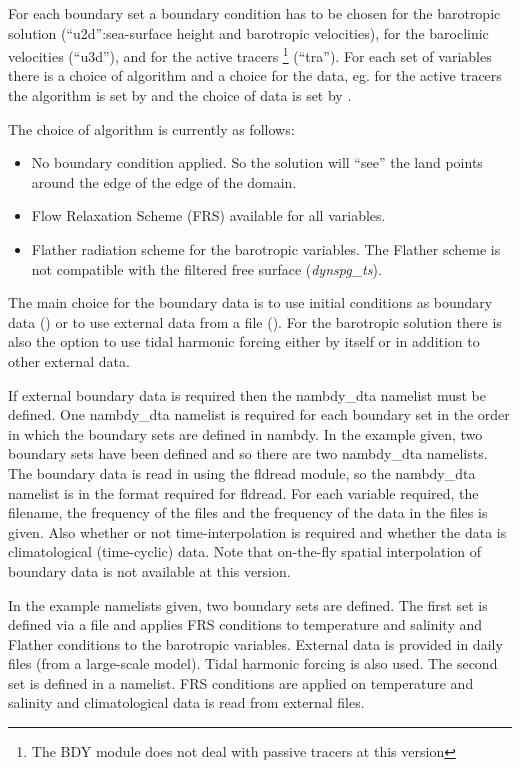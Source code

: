 \documentclass[../main/NEMO_manual]{subfiles}
\begin{document}
For each boundary set a boundary condition has to be chosen for the barotropic solution
(``u2d'':sea-surface height and barotropic velocities), for the baroclinic velocities (``u3d''), and
for the active tracers \footnote{The BDY module does not deal with passive tracers at this version} (``tra'').
For each set of variables there is a choice of algorithm and a choice for the data,
eg. for the active tracers the algorithm is set by  and the choice of data is set by . 

The choice of algorithm is currently as follows:

\begin{itemize}
\item[0.] No boundary condition applied.
  So the solution will ``see'' the land points around the edge of the edge of the domain.
\item[1.] Flow Relaxation Scheme (FRS) available for all variables.
\item[2.] Flather radiation scheme for the barotropic variables.
  The Flather scheme is not compatible with the filtered free surface
  ({\it dynspg\_ts}). 
\end{itemize}

The main choice for the boundary data is to use initial conditions as boundary data
() or to use external data from a file ().
For the barotropic solution there is also the option to use tidal harmonic forcing either by
itself or in addition to other external data. 

If external boundary data is required then the nambdy\_dta namelist must be defined.
One nambdy\_dta namelist is required for each boundary set in the order in which
the boundary sets are defined in nambdy.
In the example given, two boundary sets have been defined and so there are two nambdy\_dta namelists.
The boundary data is read in using the fldread module,
so the nambdy\_dta namelist is in the format required for fldread.
For each variable required, the filename, the frequency of the files and
the frequency of the data in the files is given.
Also whether or not time-interpolation is required and whether the data is climatological (time-cyclic) data.
Note that on-the-fly spatial interpolation of boundary data is not available at this version. 

In the example namelists given, two boundary sets are defined.
The first set is defined via a file and applies FRS conditions to temperature and salinity and
Flather conditions to the barotropic variables.
External data is provided in daily files (from a large-scale model).
Tidal harmonic forcing is also used.
The second set is defined in a namelist.
FRS conditions are applied on temperature and salinity and climatological data is read from external files. 
\end{document}
